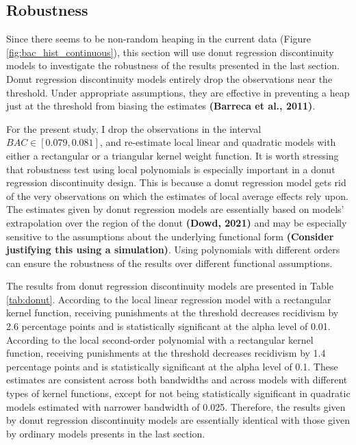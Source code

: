 \documentclass[
  11pt,
]{article}
\begin{document}
\hypertarget{robustness}{%
\subsection{Robustness}\label{robustness}}

Since there seems to be non-random heaping in the current data (Figure
\ref{fig:bac_hist_continuous}), this section will use donut regression
discontinuity models to investigate the robustness of the results
presented in the last section. Donut regression discontinuity models
entirely drop the observations near the threshold. Under appropriate
assumptions, they are effective in preventing a heap just at the
threshold from biasing the estimates \textbf{(Barreca et al., 2011)}.

For the present study, I drop the observations in the interval
\(BAC \in [0.079, 0.081]\), and re-estimate local linear and quadratic
models with either a rectangular or a triangular kernel weight function.
It is worth stressing that robustness test using local polynomials is
especially important in a donut regression discontinuity design. This is
because a donut regression model gets rid of the very observations on
which the estimates of local average effects rely upon. The estimates
given by donut regression models are essentially based on models'
extrapolation over the region of the donut \textbf{(Dowd, 2021)} and may
be especially sensitive to the assumptions about the underlying
functional form \textbf{(Consider justifying this using a simulation)}.
Using polynomials with different orders can ensure the robustness of the
results over different functional assumptions.

The results from donut regression discontinuity models are presented in
Table \ref{tab:donut}. According to the local linear regression model
with a rectangular kernel function, receiving punishments at the
threshold decreases recidivism by 2.6 percentage points and is
statistically significant at the alpha level of 0.01. According to the
local second-order polynomial with a rectangular kernel function,
receiving punishments at the threshold decreases recidivism by 1.4
percentage points and is statistically significant at the alpha level of
0.1. These estimates are consistent across both bandwidths and across
models with different types of kernel functions, except for not being
statistically significant in quadratic models estimated with narrower
bandwidth of 0.025. Therefore, the results given by donut regression
discontinuity models are essentially identical with those given by
ordinary models presents in the last section.
\end{document}
